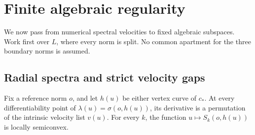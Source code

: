 \section{Finite algebraic regularity}\label{sec:finiteregularity}

We now pass from numerical spectral velocities to fixed algebraic
subspaces. Work first over $L$, where every norm is split. No common
apartment for the three boundary norms is assumed.

\subsection{Radial spectra and strict velocity gaps}

\begin{lemma}\label{lem:radialderivatives}
Fix a reference norm $o$, and let $h(u)$ be either vertex curve
of $c_*$. At every differentiability point of
$\lambda(u)=\sigma(o,h(u))$, its derivative is a permutation of
the intrinsic velocity list $v(u)$. For every $k$, the function
$u\mapsto S_k(o,h(u))$ is locally semiconvex.
\end{lemma}

